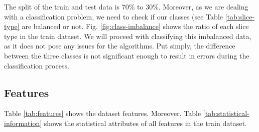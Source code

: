 \documentclass[conference]{IEEEtran}
\begin{document}
The split of the train and test data is 70\% to 30\%. Moreover, as we are dealing with a classification problem, we need to check if our classes (see Table \ref{tab:slice-type} are balanced or not. Fig. \ref{fig:class-imbalance} shows the ratio of each slice type in the train dataset. We will proceed with classifying this imbalanced data, as it does not pose any issues for the algorithms. Put simply, the difference between the three classes is not significant enough to result in errors during the classification process.

\subsection{Features}
Table \ref{tab:features} shows the dataset features. Moreover, Table \ref{tab:statistical-information} shows the statistical attributes of all features in the train dataset. 
\end{document}
